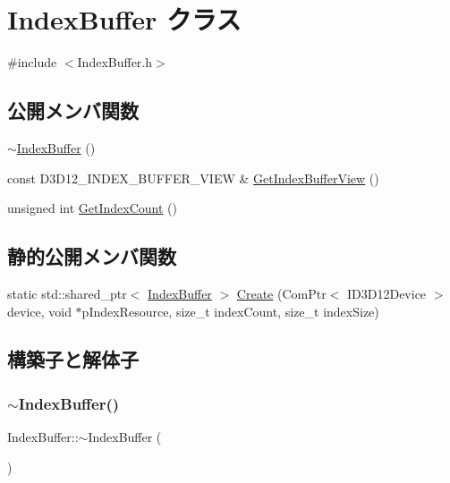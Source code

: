 \hypertarget{class_index_buffer}{}\section{Index\+Buffer クラス}
\label{class_index_buffer}


{\ttfamily \#include $<$Index\+Buffer.\+h$>$}

\subsection*{公開メンバ関数}
\begin{DoxyCompactItemize}
\item 
\mbox{\hyperlink{class_index_buffer_a348889936f378b7942c1e01d83e42866}{$\sim$\+Index\+Buffer}} ()
\item 
const D3\+D12\+\_\+\+I\+N\+D\+E\+X\+\_\+\+B\+U\+F\+F\+E\+R\+\_\+\+V\+I\+EW \& \mbox{\hyperlink{class_index_buffer_a1b2b840535e466020bf5b73fc11eff1b}{Get\+Index\+Buffer\+View}} ()
\item 
unsigned int \mbox{\hyperlink{class_index_buffer_a56fc4351097f2c2afcdf64b25a86673c}{Get\+Index\+Count}} ()
\end{DoxyCompactItemize}
\subsection*{静的公開メンバ関数}
\begin{DoxyCompactItemize}
\item 
static std\+::shared\+\_\+ptr$<$ \mbox{\hyperlink{class_index_buffer}{Index\+Buffer}} $>$ \mbox{\hyperlink{class_index_buffer_a0f2c4917bc924ab91ba8466ddb1db670}{Create}} (Com\+Ptr$<$ I\+D3\+D12\+Device $>$ device, void $\ast$p\+Index\+Resource, size\+\_\+t index\+Count, size\+\_\+t index\+Size)
\end{DoxyCompactItemize}


\subsection{構築子と解体子}
\mbox{\label{class_index_buffer_a348889936f378b7942c1e01d83e42866}} 
\subsubsection{\texorpdfstring{$\sim$\+Index\+Buffer()}{~IndexBuffer()}}
{\footnotesize\ttfamily Index\+Buffer\+::$\sim$\+Index\+Buffer (\begin{DoxyParamCaption}{ }\end{DoxyParamCaption})}




